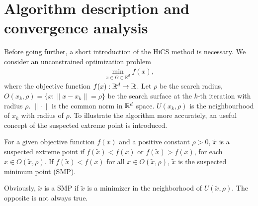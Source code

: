 \section{Algorithm description and convergence analysis}
\label{sec:algorithm}

Before going further, a short introduction of the
HiCS method is necessary.
We consider an unconstrained optimization problem 
\begin{align}
	\min_{x\in\Omega\subset\mathbb{R}^d} f(x),
	\label{}
\end{align}
where the objective function $f(x):\mathbb{R}^d\rightarrow \mathbb{R}$.
Let $\rho$ be the search radius, $O(x_k, \rho)=\{x:
\|x-x_k \|=\rho\}$ be the search surface at the
$k$-th iteration with radius $\rho$. $\|\cdot \|$ is the common
norm in $\mathbb{R}^d$ space.  $U(x_k, \rho)$ is the neighbourhood of
$x_k$ with radius of $\rho$.  To illustrate the algorithm
more accurately, an useful concept of the suspected extreme point is
introduced.
\begin{definition}	
	For a given objective function $f(x)$ and a positive constant 
	$\rho>0$, $\tilde{x}$ is a suspected extreme point if
	$f(\tilde x)<f(x)$ or $f(\tilde x)>f(x)$, for each $x \in O(\tilde{x},\rho)$.
	If $f(\tilde x) < f(x)$ for all $x\in O(\tilde{x},\rho)$,
	$\tilde{x}$ is the suspected minimum point (SMP).
\end{definition}
Obviously, $\tilde{x}$ is a SMP if $\tilde{x}$ is a minimizer in
the neighborhood of $U(\tilde{x}, \rho)$. The opposite is not always true.
